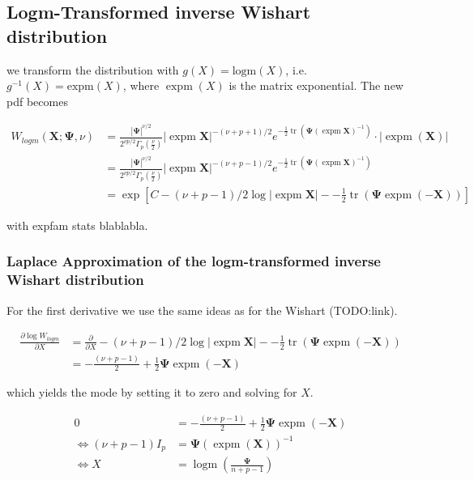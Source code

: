 \subsection{Logm-Transformed inverse Wishart distribution}

we transform the distribution with $g(X) = \text{logm}(X)$, i.e. $g^{-1}(X) = \text{expm}(X)$, where $\operatorname{expm}(X)$ is the matrix exponential. The new pdf becomes 

\begin{align}
	W_{logm}({\mathbf X}; {\mathbf \Psi}, \nu) &= \frac{\left|{\mathbf\Psi}\right|^{\nu/2}}{2^{\nu p/2}\Gamma_p(\frac \nu 2)} \left|\operatorname{expm}\mathbf{X}\right|^{-(\nu+p+1)/2} e^{-\frac{1}{2}\operatorname{tr}(\mathbf\Psi(\operatorname{expm}\mathbf{X})^{-1})} \cdot |\operatorname{expm}(\mathbf{X})|\\
	&=  \frac{\left|{\mathbf\Psi}\right|^{\nu/2}}{2^{\nu p/2}\Gamma_p(\frac \nu 2)} \left|\operatorname{expm}\mathbf{X}\right|^{-(\nu+p-1)/2} e^{-\frac{1}{2}\operatorname{tr}(\mathbf\Psi(\operatorname{expm}\mathbf{X})^{-1})} \\
	&= \exp\left[C - (\nu+p-1)/2\log  \left|\operatorname{expm}\mathbf{X}\right| - -\frac{1}{2}\operatorname{tr}(\mathbf\Psi\operatorname{expm}(\mathbf{-X}))\right]
\end{align}

with expfam stats blablabla. 

\subsubsection{Laplace Approximation of the logm-transformed inverse Wishart distribution}

For the first derivative we use the same ideas as for the Wishart (TODO:link). 

\begin{align}
	\frac{\partial \log W_{logm}}{\partial X} &= \frac{\partial}{\partial X}- (\nu+p-1)/2\log  \left|\operatorname{expm}\mathbf{X}\right| - -\frac{1}{2}\operatorname{tr}(\mathbf\Psi\operatorname{expm}(\mathbf{-X}))\\
	&= -\frac{(\nu+p-1)}{2} + \frac{1}{2}\mathbf\Psi\operatorname{expm}(\mathbf{-X})
\end{align}

which yields the mode by setting it to zero and solving for $X$.

\begin{align}
	0 &= -\frac{(\nu+p-1)}{2} + \frac{1}{2}\mathbf\Psi\operatorname{expm}(\mathbf{-X}) \\
	\Leftrightarrow (\nu+p-1) I_p &=  \mathbf\Psi(\operatorname{expm}(\mathbf{X}))^{-1} \\
	\Leftrightarrow X &= \operatorname{logm}\left(\frac{\mathbf\Psi}{n+p-1}\right)
\end{align}

